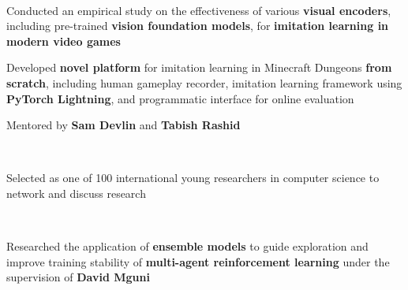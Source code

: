 \documentclass[]{lukas-cv-openfont}
\begin{document}
\noindent
{}
\\
\begin{tightitemize}{1.7em}
    \item Conducted an empirical study on the effectiveness of various \textbf{visual encoders}, including pre-trained \textbf{vision foundation models}, for \textbf{imitation learning in modern video games} \cite{schaefer2023visual}
    \item Developed \textbf{novel platform} for imitation learning in Minecraft Dungeons \textbf{from scratch}, including human gameplay recorder, imitation learning framework using \textbf{PyTorch Lightning}, and programmatic interface for online evaluation
    \item Mentored by \textbf{Sam Devlin} and \textbf{Tabish Rashid}
\end{tightitemize}
\sectionsep

\noindent
{}
\\
\begin{tightitemize}{1.7em}
    \item Selected as one of 100 international young researchers in computer science to network and discuss research
\end{tightitemize}
\sectionsep

\noindent
{}
\\
\begin{tightitemize}{1.7em}
    \item Researched the application of \textbf{ensemble models} to guide exploration and improve training stability of \textbf{multi-agent reinforcement learning} under the supervision of \textbf{David Mguni} \cite{schaefer2023emax}
\end{tightitemize}
\sectionsep
\end{document}

